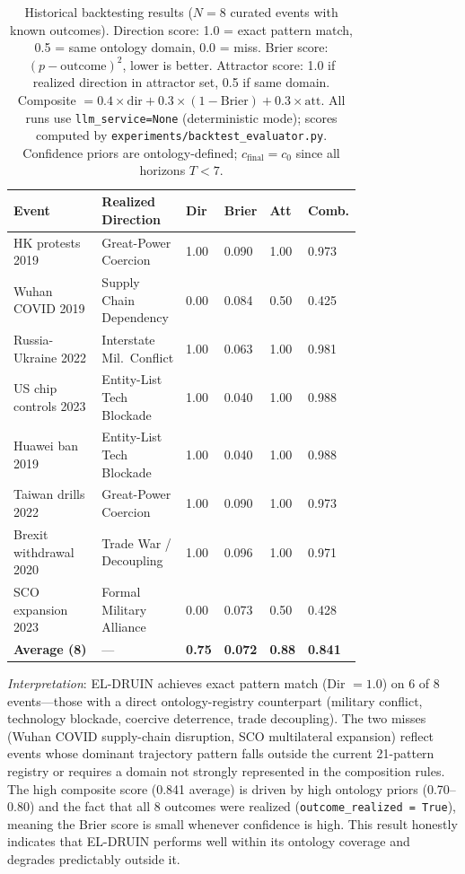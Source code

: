 \documentclass{llncs}
\begin{document}
\begin{table}[h]
\centering
\caption{Historical backtesting results ($N=8$ curated events with known outcomes). Direction
score: 1.0 = exact pattern match, 0.5 = same ontology domain, 0.0 = miss. Brier score:
$(p - \text{outcome})^2$, lower is better. Attractor score: 1.0 if realized direction in
attractor set, 0.5 if same domain. Composite $= 0.4 \times \text{dir} + 0.3 \times
(1 - \text{Brier}) + 0.3 \times \text{att}$. All runs use \texttt{llm\_service=None}
(deterministic mode); scores computed by \texttt{experiments/backtest\_evaluator.py}.
Confidence priors are ontology-defined; $c_{\mathrm{final}} = c_0$ since all horizons
$T < 7$.}
\label{tab:backtest}
\begin{tabular}{@{}p{0.28\linewidth}p{0.21\linewidth}p{0.06\linewidth}p{0.07\linewidth}p{0.06\linewidth}p{0.09\linewidth}@{}}
\toprule
Event & Realized Direction & Dir & Brier & Att & Comb. \\
\midrule
HK protests 2019         & Great-Power Coercion     & 1.00 & 0.090 & 1.00 & 0.973 \\
Wuhan COVID 2019         & Supply Chain Dependency  & 0.00 & 0.084 & 0.50 & 0.425 \\
Russia-Ukraine 2022      & Interstate Mil.\ Conflict& 1.00 & 0.063 & 1.00 & 0.981 \\
US chip controls 2023    & Entity-List Tech Blockade& 1.00 & 0.040 & 1.00 & 0.988 \\
Huawei ban 2019          & Entity-List Tech Blockade& 1.00 & 0.040 & 1.00 & 0.988 \\
Taiwan drills 2022       & Great-Power Coercion     & 1.00 & 0.090 & 1.00 & 0.973 \\
Brexit withdrawal 2020   & Trade War / Decoupling   & 1.00 & 0.096 & 1.00 & 0.971 \\
SCO expansion 2023       & Formal Military Alliance & 0.00 & 0.073 & 0.50 & 0.428 \\
\midrule
\textbf{Average (8)}     & ---                      & \textbf{0.75} & \textbf{0.072} & \textbf{0.88} & \textbf{0.841} \\
\bottomrule
\end{tabular}
\end{table}

\noindent\textit{Interpretation}: EL-DRUIN achieves exact pattern match (Dir $= 1.0$) on 6
of 8 events---those with a direct ontology-registry counterpart (military conflict, technology
blockade, coercive deterrence, trade decoupling). The two misses (Wuhan COVID supply-chain
disruption, SCO multilateral expansion) reflect events whose dominant trajectory pattern falls
outside the current 21-pattern registry or requires a domain not strongly represented in the
composition rules. The high composite score (0.841 average) is driven by high ontology priors
(0.70--0.80) and the fact that all 8 outcomes were realized (\texttt{outcome\_realized = True}),
meaning the Brier score is small whenever confidence is high. This result honestly indicates
that EL-DRUIN performs well within its ontology coverage and degrades predictably outside it.
\end{document}
